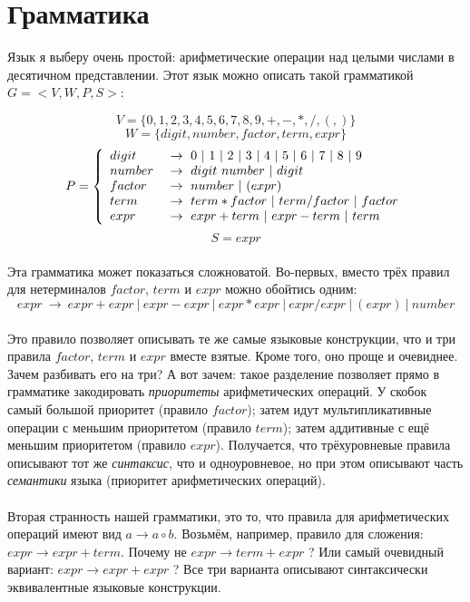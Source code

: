 \documentclass[11pt]{book}
\begin{document}
\section{Грамматика}
Язык я выберу очень простой: арифметические операции над целыми числами
в десятичном представлении. Этот язык можно описать такой грамматикой $G=<V,W,P,S>$:

$$V=\{0,1,2,3,4,5,6,7,8,9,+,-,*,/,(,)\}$$
$$W=\{digit, number, factor, term, expr\}$$
$$P=\left\{
\begin{array}{l l}
digit \  & \rightarrow \ 0 \ | \ 1 \ | \ 2 \ | \ 3 \ | \ 4 \ | \ 5 \ | \ 6 \ | \ 7 \ | \ 8 \ | \ 9
\\
number \  & \rightarrow \ digit \ number \ | \ digit
\\
factor \  & \rightarrow \ number \ | \ ( expr )
\\
term \  & \rightarrow \ term * factor \ | \ term / factor \ | \ factor
\\
expr \  & \rightarrow \ expr + term \ | \ expr - term \ | \ term
\end{array}
\right. $$
$$S=expr$$
\\
Эта грамматика может показаться сложноватой.
Во-первых, вместо трёх правил для нетерминалов $factor$, $term$ и $expr$ можно обойтись
одним:
$$expr \  \rightarrow \ expr + expr \ | \ expr - expr \ | \ expr * expr \ | \ expr / expr \ | \ ( expr ) \ | \ number$$
\\
Это правило позволяет описывать те же самые языковые конструкции, что и три правила $factor$, $term$ и $expr$ вместе взятые.
Кроме того, оно проще и очевиднее. Зачем разбивать его на три? А вот зачем:
такое разделение позволяет прямо в грамматике закодировать \emph{приоритеты} арифметических операций.
У скобок самый большой приоритет (правило $factor$); затем идут мультипликативные операции с меньшим приоритетом (правило $term$);
затем аддитивные с ещё меньшим приоритетом (правило $expr$). Получается, что трёхуровневые правила
описывают тот же \emph{синтаксис}, что и одноуровневое, но при этом описывают часть \emph{семантики} языка
(приоритет арифметических операций).
\\ \\
Вторая странность нашей грамматики, это то, что правила для арифметических операций имеют вид
$a \rightarrow a \circ b$. Возьмём, например, правило для сложения:
$expr \rightarrow expr + term$. Почему не $expr \rightarrow term + expr$ ? Или самый очевидный
вариант: $expr \rightarrow expr + expr$ ? Все три варианта описывают синтаксически эквивалентные языковые конструкции.
\end{document}
